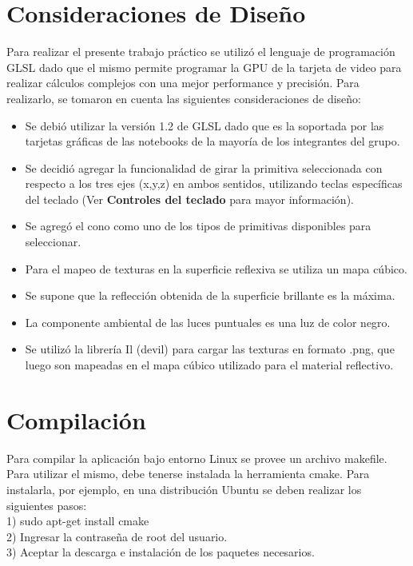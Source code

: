 \documentclass[11pt]{article}
\begin{document}
\begin{center}
\end{center}

\newpage


\section{Consideraciones de Dise\~no}
Para realizar el presente trabajo pr\'actico se utiliz\'o el lenguaje de programaci\'on GLSL dado que el mismo permite programar la GPU 
de la tarjeta de video para realizar c\'alculos complejos con una mejor performance y precisi\'on.
  Para realizarlo, se tomaron en cuenta las siguientes consideraciones de dise\~no:
\begin{itemize} 
 \item Se debi\'o utilizar la versi\'on 1.2 de GLSL dado que es la soportada por las tarjetas gr\'aficas de las notebooks de la mayor\'ia de 
los integrantes del grupo.
 \item Se decidi\'o agregar la funcionalidad de girar la primitiva seleccionada con respecto a los tres ejes (x,y,z) en ambos sentidos, utilizando teclas espec\'ificas del 
teclado (Ver {\bf Controles del teclado} para mayor informaci\'on).
 \item Se agreg\'o el cono como uno de los tipos de primitivas disponibles para seleccionar.
 \item Para el mapeo de texturas en la superficie reflexiva se utiliza un mapa c\'ubico.
 \item Se supone que la reflecci\'on obtenida de la superficie brillante es la m\'axima.
 \item La componente ambiental de las luces puntuales es una luz de color negro.
 \item Se utiliz\'o la librer\'ia Il (devil) para cargar las texturas en formato .png, que luego son mapeadas en el mapa c\'ubico utilizado para el 
material reflectivo.
\end{itemize}


\newpage

\section{Compilaci\'on}
  Para compilar la aplicaci\'on bajo entorno Linux se provee un archivo makefile.
  Para utilizar el mismo, debe tenerse instalada la herramienta cmake. Para instalarla, por ejemplo, en una distribuci\'on Ubuntu se deben 
realizar los siguientes pasos: \\
1) sudo apt-get install cmake \\
2) Ingresar la contrase\~na de root del usuario. \\
3) Aceptar la descarga e instalaci\'on de los paquetes necesarios. \\ 
\end{document}
